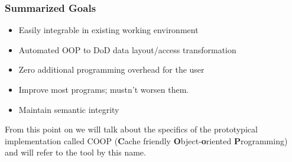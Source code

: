 \subsubsection{Summarized Goals}
\begin{itemize}
	\item Easily integrable in existing working environment
	\item Automated OOP to DoD data layout/access transformation
	\item Zero additional programming overhead for the user
	\item Improve most programs; mustn't worsen them.
	\item Maintain semantic integrity

\end{itemize}
From this point on we will talk about the specifics of the prototypical implementation called COOP (\textbf{C}ache friendly \textbf{O}bject-\textbf{o}riented \textbf{P}rogramming) and will refer to the tool by this name.

